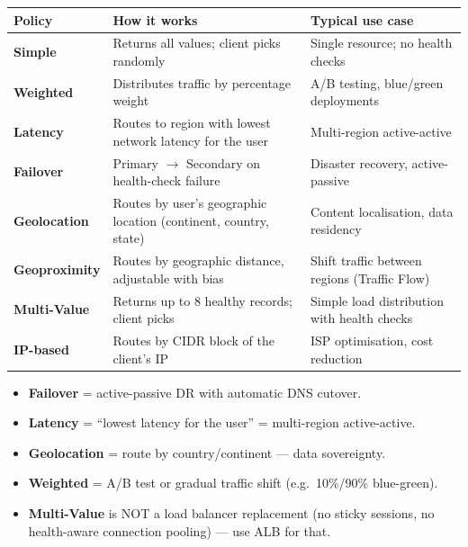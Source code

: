 \begin{comparebox}[title={Route~53 routing policies}]
\begin{tabular}{@{}p{3cm}p{5cm}p{4cm}@{}}
\toprule
\textbf{Policy} & \textbf{How it works} & \textbf{Typical use case} \\
\midrule
\textbf{Simple}      & Returns all values; client picks randomly &
  Single resource; no health checks \\[4pt]
\textbf{Weighted}    & Distributes traffic by percentage weight &
  A/B testing, blue/green deployments \\[4pt]
\textbf{Latency}     & Routes to region with lowest network latency for the user &
  Multi-region active-active \\[4pt]
\textbf{Failover}    & Primary $\rightarrow$ Secondary on health-check failure &
  Disaster recovery, active-passive \\[4pt]
\textbf{Geolocation} & Routes by user's geographic location (continent, country, state) &
  Content localisation, data residency \\[4pt]
\textbf{Geoproximity} & Routes by geographic distance, adjustable with bias &
  Shift traffic between regions (Traffic Flow) \\[4pt]
\textbf{Multi-Value} & Returns up to 8 healthy records; client picks &
  Simple load distribution with health checks \\[4pt]
\textbf{IP-based}    & Routes by CIDR block of the client's IP &
  ISP optimisation, cost reduction \\
\bottomrule
\end{tabular}
\end{comparebox}

\begin{examtip}
\begin{itemize}
  \item \textbf{Failover} = active-passive DR with automatic DNS cutover.
  \item \textbf{Latency} = ``lowest latency for the user'' = multi-region active-active.
  \item \textbf{Geolocation} = route by country/continent --- data sovereignty.
  \item \textbf{Weighted} = A/B test or gradual traffic shift (e.g.\ 10\%/90\% blue-green).
  \item \textbf{Multi-Value} is NOT a load balancer replacement (no sticky sessions,
        no health-aware connection pooling) --- use ALB for that.
\end{itemize}
\end{examtip}

